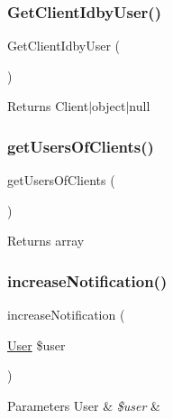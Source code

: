 \subsubsection{\texorpdfstring{GetClientIdbyUser()}{GetClientIdbyUser()}}
{\footnotesize\ttfamily Get\+Client\+Idby\+User (\begin{DoxyParamCaption}{ }\end{DoxyParamCaption})}

\begin{DoxyReturn}{Returns}
Client$\vert$object$\vert$null 
\end{DoxyReturn}
\mbox{\label{class_app_1_1_b_l_1_1_user_manager_a0cefe2180fc2ed5b78a5796ebcce3479}} 
\subsubsection{\texorpdfstring{getUsersOfClients()}{getUsersOfClients()}}
{\footnotesize\ttfamily get\+Users\+Of\+Clients (\begin{DoxyParamCaption}{ }\end{DoxyParamCaption})}

\begin{DoxyReturn}{Returns}
array 
\end{DoxyReturn}
\mbox{\label{class_app_1_1_b_l_1_1_user_manager_ab44bcaaf98a5da921848e0557b713dd9}} 
\subsubsection{\texorpdfstring{increaseNotification()}{increaseNotification()}}
{\footnotesize\ttfamily increase\+Notification (\begin{DoxyParamCaption}\item[{\mbox{\hyperlink{class_app_1_1_entity_1_1_user}{User}}}]{\$user }\end{DoxyParamCaption})}


\begin{DoxyParams}[1]{Parameters}
User & {\em \$user} & \\
\hline
\end{DoxyParams}
\mbox{\label{class_app_1_1_b_l_1_1_user_manager_a0dd4bd96cbcb34ab325f849d2fe3cb5c}} 
